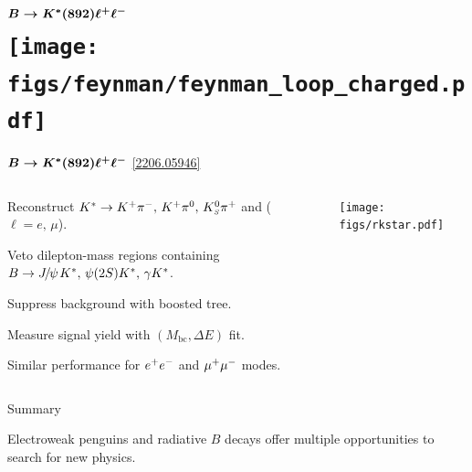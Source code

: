 \section{$\boldsymbol{B\rightarrow K^*(892)\ell^+ \ell^-}$ \\ \hfill \texttt{[image: figs/feynman/feynman\_loop\_charged.pdf]}}
\begin{frame}{$\boldsymbol{B\rightarrow K^*(892)\ell^+ \ell^-}$ \hfill \href{https://arxiv.org/abs/2206.05946}{[2206.05946]}}
\begin{columns}
\begin{column}{0.6\linewidth}
\bi
\item {\footnotesize Reconstruct $K^*\rightarrow K^+\pi^-,\,K^+\pi^0,\,K^0_{\scriptscriptstyle S}\pi^+$ and \ellell ($\ell=e,\,\mu$).}
\item {\footnotesize Veto dilepton-mass regions containing $B\rightarrow{J\mskip -3mu/\mskip -2mu\psi\mskip 2mu}K^*,\,\psi(2S)K^*,\,\gamma K^*$.}
\item {\footnotesize Suppress background with boosted tree.}
\item {\footnotesize Measure signal yield with $(M_{\mathrm{bc}},\Delta E)$ fit.}
\ei
\centering
\vspace{0.1cm}
\bi
\item {\footnotesize Similar performance for $e^+e^-$ and $\mu^+\mu^-$ modes.}
\ei
\end{column}
\begin{column}{0.4\linewidth}
\texttt{[image: figs/rkstar.pdf]}
\end{column}
\end{columns}
\end{frame}
\begin{frame}{Summary}
\bi
\item {\footnotesize Electroweak penguins and radiative $B$ decays offer multiple opportunities to search for new physics.}
\bi
{}
\ei
{} 
\bi
{}
\ei
\ei
\end{frame}
